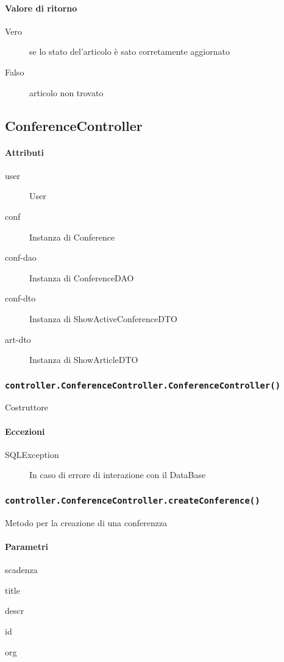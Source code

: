 \paragraph{Valore di ritorno}
\begin{description}
\item[Vero] se lo stato del'articolo è sato corretamente aggiornato
\item[Falso] articolo non trovato
\end{description}



\subsection{ConferenceController}
\paragraph{Attributi}
\begin{description}
\item[user] User
\item[conf] Instanza di Conference 
\item[conf-dao] Instanza di ConferenceDAO
\item[conf-dto] Instanza di ShowActiveConferenceDTO
\item[art-dto] Instanza di ShowArticleDTO
\end{description}

\subsubsection{\texttt{controller.ConferenceController.ConferenceController()}}
Costruttore
\paragraph{Eccezioni}
\begin{description}
\item[SQLException] In caso di errore di interazione con il DataBase
\end{description}

\subsubsection{\texttt{controller.ConferenceController.createConference()}}
Metodo per la creazione di una conferenzza
\paragraph{Parametri}
\begin{description}
\item scadenza
\item title
\item descr
\item id
\item org
\end{description}
